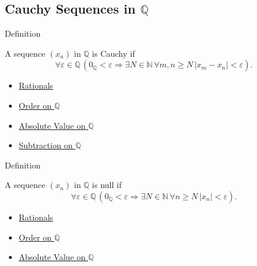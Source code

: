 \subsection*{Cauchy Sequences in $\mathbb{Q}$}

\begin{definitionbox}{Definition}
\begin{definition}
\label{def:cauchy-sequence-in-q}
A sequence $(x_n)$ in $\mathbb{Q}$ is Cauchy if
\[
\forall\varepsilon\in\mathbb{Q}\,
\left(
0_{\mathbb{Q}}<\varepsilon
\Longrightarrow
\exists N\in\mathbb{N}\,
\forall m,n\ge N\,
\left|x_m-x_n\right|<\varepsilon
\right).
\]
\end{definition}
\end{definitionbox}

\begin{dependencies}
\begin{itemize}
  \item \hyperref[def:rationals]{Rationals}
  \item \hyperref[def:order-on-q]{Order on $\mathbb{Q}$}
  \item \hyperref[def:absolute-value-on-q]{Absolute Value on $\mathbb{Q}$}
  \item \hyperref[def:subtraction-on-q]{Subtraction on $\mathbb{Q}$}
\end{itemize}
\end{dependencies}

\begin{definitionbox}{Definition}
\begin{definition}
\label{def:null-sequence-in-q}
A sequence $(x_n)$ in $\mathbb{Q}$ is null if
\[
\forall\varepsilon\in\mathbb{Q}\,
\left(
0_{\mathbb{Q}}<\varepsilon
\Longrightarrow
\exists N\in\mathbb{N}\,
\forall n\ge N\,
\left|x_n\right|<\varepsilon
\right).
\]
\end{definition}
\end{definitionbox}

\begin{dependencies}
\begin{itemize}
  \item \hyperref[def:rationals]{Rationals}
  \item \hyperref[def:order-on-q]{Order on $\mathbb{Q}$}
  \item \hyperref[def:absolute-value-on-q]{Absolute Value on $\mathbb{Q}$}
\end{itemize}
\end{dependencies}

